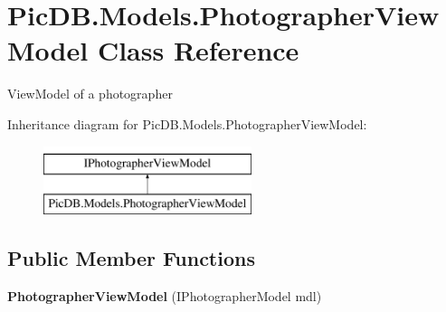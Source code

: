 \hypertarget{class_pic_d_b_1_1_models_1_1_photographer_view_model}{}\section{Pic\+D\+B.\+Models.\+Photographer\+View\+Model Class Reference}
\label{class_pic_d_b_1_1_models_1_1_photographer_view_model}


View\+Model of a photographer  


Inheritance diagram for Pic\+D\+B.\+Models.\+Photographer\+View\+Model\+:\begin{figure}[H]
\begin{center}
\leavevmode
\includegraphics[height=2.000000cm]{class_pic_d_b_1_1_models_1_1_photographer_view_model}
\end{center}
\end{figure}
\subsection*{Public Member Functions}
\begin{DoxyCompactItemize}
\item 
\mbox{\label{class_pic_d_b_1_1_models_1_1_photographer_view_model_af43073cd5f85ea931b7fdc465593982a}} 
{\bfseries Photographer\+View\+Model} (I\+Photographer\+Model mdl)
\end{DoxyCompactItemize}
